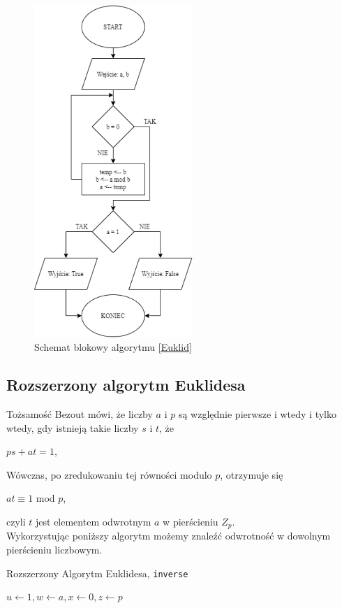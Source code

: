 \documentclass[]{article}
\begin{document}
	\begin{figure}[H]
		\begin{center}
			\includegraphics[width=6cm]{alg 7.png} \caption{Schemat blokowy algorytmu \ref{Euklid}}
		\end{center}
	\end{figure}

	\subsection{Rozszerzony algorytm Euklidesa}
		Tożsamość Bezout mówi, że liczby $a$ i $p$ są względnie pierwsze i wtedy i tylko wtedy, gdy istnieją takie liczby $s$ i $t$, że
		\begin{center}
			$ps + at = 1$,
		\end{center}
		Wówczas, po zredukowaniu tej równości modulo $p$, otrzymuje się
		\begin{center}
			$at \equiv 1$ mod $p$,
		\end{center}
		 czyli $t$ jest elementem odwrotnym $a$ w pierścieniu $Z_{p}$. \\
		Wykorzystując poniższy algorytm możemy znaleźć odwrotność w dowolnym pierścieniu liczbowym.
		
		\begin{algorithm}[H]
			\label{extEuklid}
			\caption{Rozszerzony Algorytm Euklidesa, \texttt{inverse}}
			\BlankLine
			$u \leftarrow 1, w \leftarrow a, x \leftarrow 0,z \leftarrow p$ \\
		\end{algorithm}
	
\end{document}
